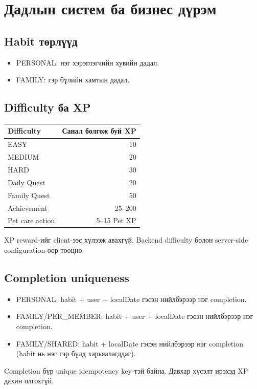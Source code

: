 \documentclass[12pt,a4paper,oneside]{report}
\begin{document}
\chapter{Дадлын систем ба бизнес дүрэм}

\section{Habit төрлүүд}
\begin{itemize}
  \item PERSONAL: нэг хэрэглэгчийн хувийн дадал.
  \item FAMILY: гэр бүлийн хамтын дадал.
\end{itemize}

\section{Difficulty ба XP}
\begin{longtable}{p{}r}
\toprule
\textbf{Difficulty} & \textbf{Санал болгож буй XP}\\
\midrule
EASY & 10\\
MEDIUM & 20\\
HARD & 30\\
Daily Quest & 20\\
Family Quest & 50\\
Achievement & 25--200\\
Pet care action & 5--15 Pet XP\\
\bottomrule
\end{longtable}
XP reward-ийг client-ээс хүлээж авахгүй. Backend difficulty болон server-side configuration-оор тооцно.

\section{Completion uniqueness}
\begin{itemize}
  \item PERSONAL: habit + user + localDate гэсэн нийлбэрээр нэг completion.
  \item FAMILY/PER\_MEMBER: habit + user + localDate гэсэн нийлбэрээр нэг completion.
  \item FAMILY/SHARED: habit + localDate гэсэн нийлбэрээр нэг completion (habit нь нэг гэр бүлд харьяалагддаг).
\end{itemize}
Completion бүр unique idempotency key-тэй байна. Давхар хүсэлт ирэхэд XP дахин олгохгүй.
\end{document}
